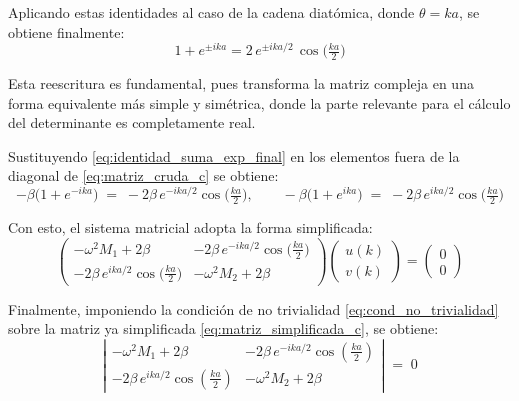 \documentclass{article}
\begin{document}
Aplicando estas identidades al caso de la cadena diatómica, donde \(\theta = ka\),
se obtiene finalmente:
\begin{equation}
1 + e^{\pm ika} = 2\,e^{\pm ika/2}\,\cos\!\Big(\tfrac{ka}{2}\Big)
\label{eq:identidad_suma_exp_final}
\end{equation}

Esta reescritura es fundamental, pues transforma la matriz compleja en una forma equivalente más simple
y simétrica, donde la parte relevante para el cálculo del determinante es completamente real.


Sustituyendo \eqref{eq:identidad_suma_exp_final} en los elementos fuera de la diagonal de \eqref{eq:matriz_cruda_c} se obtiene:
\begin{equation}
-\beta\big(1+e^{-ika}\big) \;=\; -2\beta\,e^{-ika/2}\cos\!\Big(\tfrac{ka}{2}\Big),
\qquad
-\beta\big(1+e^{ika}\big) \;=\; -2\beta\,e^{ika/2}\cos\!\Big(\tfrac{ka}{2}\Big)
\label{eq:acoplos_simplificados}
\end{equation}

Con esto, el sistema matricial adopta la forma simplificada:
\begin{equation}
\begin{pmatrix}
-\omega^{2}M_{1}+2\beta
& -2\beta\,e^{-ika/2}\cos\!\big(\tfrac{ka}{2}\big)\\[6pt]
-2\beta\,e^{ika/2}\cos\!\big(\tfrac{ka}{2}\big)
& -\omega^{2}M_{2}+2\beta
\end{pmatrix}
\begin{pmatrix}
u(k)\\[2pt] v(k)
\end{pmatrix}
=
\begin{pmatrix}
0\\[2pt] 0
\end{pmatrix}
\label{eq:matriz_simplificada_c}
\end{equation}



Finalmente, imponiendo la condición de no trivialidad \eqref{eq:cond_no_trivialidad} sobre la matriz ya simplificada \eqref{eq:matriz_simplificada_c}, se obtiene:
\begin{equation}
\left|
\begin{array}{cc}
-\omega^{2}M_{1}+2\beta & -2\beta\,e^{-ika/2}\cos\!\left(\tfrac{ka}{2}\right)\\[6pt]
-2\beta\,e^{ika/2}\cos\!\left(\tfrac{ka}{2}\right) & -\omega^{2}M_{2}+2\beta
\end{array}
\right| \;=\; 0
\label{eq:determinante_c}
\end{equation}
\end{document}
